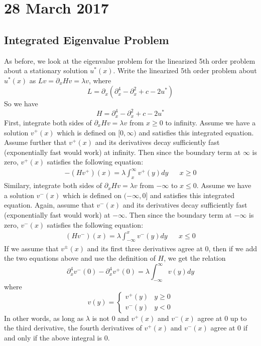 \documentclass[12pt]{article}
\begin{document}
\section*{28 March 2017}

\subsection*{Integrated Eigenvalue Problem}

As before, we look at the eigenvalue problem for the linearized 5th order problem about a stationary solution $u^*(x)$. Write the linearized 5th order problem about $u^*(x)$ as $Lv = \partial_x Hv = \lambda v$, where
\[
L = \partial_x( \partial_x^4 - \partial_x^2 + c - 2u^*)
\]
So we have 
\[
H = \partial_x^4 - \partial_x^2 + c - 2u^*
\]
First, integrate both sides of $\partial_x Hv = \lambda v$ from $x\geq 0$ to infinity. Assume we have a solution $v^+(x)$ which is defined on $[0, \infty)$ and satisfies this integrated equation. Assume further that $v^+(x)$ and its derivatives decay sufficiently fast (exponentially fast would work) at infinity. Then since the boundary term at $\infty$ is zero, $v^+(x)$ satisfies the following equation:
\begin{align*}
-(Hv^+)(x) = \lambda \int_x^\infty v^+(y) dy && x \geq 0
\end{align*}
Similary, integrate both sides of $\partial_x Hv = \lambda v$ from $-\infty$ to $x \leq 0$. Assume we have a solution $v^-(x)$ which is defined on $(-\infty,0]$ and satisfies this integrated equation. Again, assume that $v^-(x)$ and its derivatives decay sufficiently fast (exponentially fast would work) at $-\infty$. Then since the boundary term at $-\infty$ is zero, $v^-(x)$ satisfies the following equation:
\begin{align*}
(Hv^-)(x) = \lambda \int_{-\infty}^x v^-(y) dy && x \leq 0
\end{align*}
If we assume that $v^\pm(x)$ and its first three derivatives agree at 0, then if we add the two equations above and use the definition of $H$, we get the relation
\[
\partial_x^4 v^-(0) - \partial_x^4 v^+(0) = \lambda \int_{-\infty}^\infty v(y) dy
\]
where 
\[
v(y) = \begin{cases}
v^+(y) & y \geq 0 \\
v^-(y) & y < 0
\end{cases}
\]
In other words, as long as $\lambda$ is not 0 and $v^+(x)$ and $v^-(x)$ agree at 0 up to the third derivative, the fourth derivatives of $v^+(x)$ and $v^-(x)$ agree at 0 if and only if the above integral is 0. \\
\end{document}
